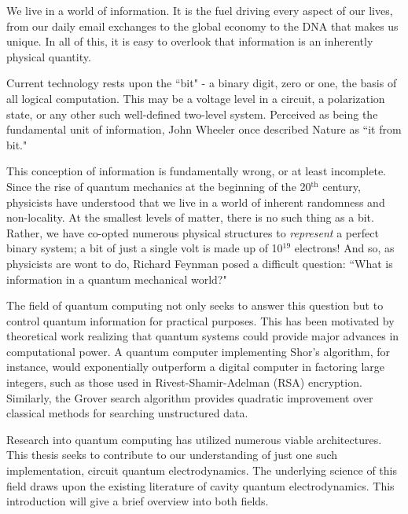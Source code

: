 \documentclass[11 pt, oneside]{book} %
\begin{document}
We live in a world of information. It is the fuel driving every aspect of our lives, from our daily email exchanges to the global economy to the DNA that makes us unique. In all of this, it is easy to overlook that information is an inherently physical quantity. 

Current technology rests upon the ``bit" - a binary digit, zero or one, the basis of all logical computation. This may be a voltage level in a circuit, a polarization state, or any other such well-defined two-level system. Perceived as being the fundamental unit of information, John Wheeler once described Nature as ``it from bit."

This conception of information is fundamentally wrong, or at least incomplete. Since the rise of quantum mechanics at the beginning of the 20$^{\mathrm{th}}$ century, physicists have understood that we live in a world of inherent randomness and non-locality. At the smallest levels of matter, there is no such thing as a bit. Rather, we have co-opted numerous physical structures to \emph{represent} a perfect binary system; a bit of just a single volt is made up of 10$^{19}$ electrons! And so, as physicists are wont to do, Richard Feynman posed a difficult question: ``What is information in a quantum mechanical world?" 

The field of quantum computing not only seeks to answer this question but to control quantum information for practical purposes. This has been motivated by theoretical work realizing that quantum systems could provide major advances in computational power. A quantum computer implementing Shor's algorithm\cite{Shor}, for instance, would exponentially outperform a digital computer in factoring large integers, such as those used in Rivest-Shamir-Adelman (RSA) encryption. Similarly, the Grover search algorithm\cite{Grover} provides quadratic improvement over classical methods for searching unstructured data.

Research into quantum computing has utilized numerous viable architectures. This thesis seeks to contribute to our understanding of just one such implementation, circuit quantum electrodynamics. The underlying science of this field draws upon the existing literature of cavity quantum electrodynamics. This introduction will give a brief overview into both fields. 



\end{document}
